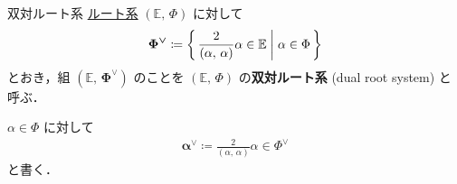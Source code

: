 \documentclass[rep_main]{subfiles}
\begin{document}
\begin{mydef}[label=def:dual-root]{双対ルート系}
	\hyperref[ax:root-system]{ルート系} $(\mathbb{E},\, \Phi)$ に対して
	\begin{align}
		\bm{\Phi^{\vee}} \coloneqq \biggl\{\, \frac{2}{(\alpha,\, \alpha)} \alpha \in \mathbb{E} \biggm| \alpha \in \Phi \,\biggr\} 
	\end{align}
	とおき，組 $\bm{(\mathbb{E},\, \Phi^\vee)}$ のことを $(\mathbb{E},\, \Phi)$ の\textbf{双対ルート系} (dual root system) と呼ぶ．
	
	\tcblower
	
	$\alpha \in \Phi$ に対して
	\begin{align}
		\bm{\alpha^\vee} \coloneqq \frac{2}{(\alpha,\, \alpha)} \alpha \in \Phi^\vee
	\end{align}
	と書く．
\end{mydef}
\end{document}
